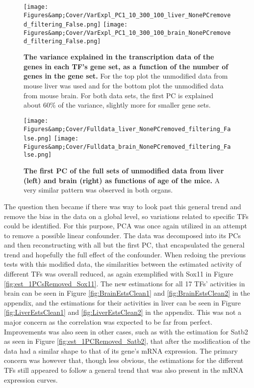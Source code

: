 \begin{figure}
    \centering
    \texttt{[image: Figures\&amp;Cover/VarExpl\_PC1\_10\_300\_100\_liver\_NonePCremoved\_filtering\_False.png]}
    \texttt{[image: Figures\&amp;Cover/VarExpl\_PC1\_10\_300\_100\_brain\_NonePCremoved\_filtering\_False.png]}
    \caption{\textbf{The variance explained in the transcription data of the genes in each \ac{TF}'s gene set, as a function of the number of genes in the gene set.}  For the top plot the unmodified data from mouse liver was used and for the bottom plot the unmodified data from mouse brain. For both data sets, the first \ac{PC} is explained about 60\% of the variance, slightly more for smaller gene sets.}
    \label{fig:VarExp_allPCs}
\end{figure}

\begin{figure}
    \centering
    \texttt{[image: Figures\&amp;Cover/Fulldata\_liver\_NonePCremoved\_filtering\_False.png]}
    \texttt{[image: Figures\&amp;Cover/Fulldata\_brain\_NonePCremoved\_filtering\_False.png]}
    \caption{\textbf{The first \ac{PC} of the full sets of unmodified data from liver (left) and brain (right) as functions of age of the mice.} A very similar pattern was observed in both organs.}
    \label{fig:firstPC}
\end{figure}
\vspace{2cm}
\noindent The question then became if there was way to look past this general trend and remove the bias in the data on a global level, so variations related to specific \acp{TF} could be identified. For this purpose, \ac{PCA} was once again utilized in an attempt to remove a possible linear confounder. The data was decomposed into its \acp{PC} and then reconstructing with all but the first \ac{PC}, that encapsulated the general trend and hopefully the full effect of the confounder. When redoing the previous tests with this modified data, the similarities between the estimated activity of different \acp{TF} was overall reduced, as again exemplified with Sox11 in Figure \ref{fig:est_1PCsRemoved_Sox11}. The new estimations for all 17 \acp{TF}' activities in brain can be seen in Figure \ref{fig:BrainEstsClean1} and \ref{fig:BrainEstsClean2} in the appendix, and the estimations for their activities in liver can be seen in Figure \ref{fig:LiverEstsClean1} and \ref{fig:LiverEstsClean2} in the appendix. This was not a major concern as the correlation was expected to be far from perfect. Improvements was also seen in other cases, such as with the estimation for Satb2 as seen in Figure \ref{fig:est_1PCRemoved_Satb2}, that after the modification of the data had a similar shape to that of its gene's mRNA expression. The primary concern was however that, though less obvious, the estimations for the different \acp{TF} still appeared to follow a general trend that was also present in the mRNA expression curves. 

